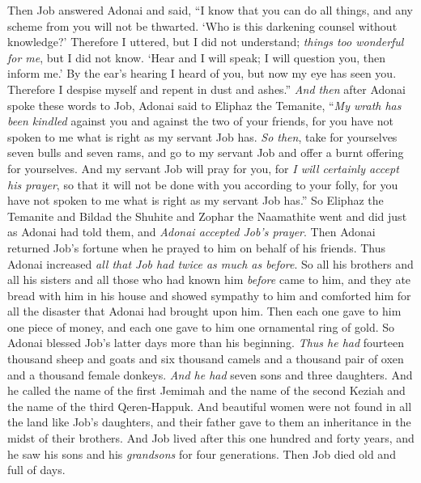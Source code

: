 \begin{biblechapter} %
 Then Job answered Adonai and said,
\verse “I know that you can do all things, 
and any scheme from you will not be thwarted.
\verse ‘Who is this darkening counsel without knowledge?’ 
Therefore I uttered, but I did not understand; 
\textit{things too wonderful for me}, but I did not know.
\verse ‘Hear and I will speak; 
I will question you, then inform me.’
\verse By the ear’s hearing I heard of you, 
but now my eye has seen you.
\verse Therefore I despise myself 
and repent in dust and ashes.”
\verse \textit{And then} after Adonai spoke these words to Job, Adonai said to Eliphaz the Temanite, “\textit{My wrath has been kindled} against you and against the two of your friends, for you have not spoken to me what is right as my servant Job has.
\verse \textit{So then}, take for yourselves seven bulls and seven rams, and go to my servant Job and offer a burnt offering for yourselves. And my servant Job will pray for you, for \textit{I will certainly accept his prayer}, so that it will not be done with you according to your folly, for you have not spoken to me what is right as my servant Job has.”
\verse So Eliphaz the Temanite and Bildad the Shuhite and Zophar the Naamathite went and did just as Adonai had told them, and \textit{Adonai accepted Job’s prayer}.
\verse Then Adonai returned Job’s fortune when he prayed to him on behalf of his friends. Thus Adonai increased \textit{all that Job had twice as much as before}.
\verse So all his brothers and all his sisters and all those who had known him \textit{before} came to him, and they ate bread with him in his house and showed sympathy to him and comforted him for all the disaster that Adonai had brought upon him. Then each one gave to him one piece of money, and each one gave to him one ornamental ring of gold.
\verse So Adonai blessed Job’s latter days more than his beginning. \textit{Thus he had} fourteen thousand sheep and goats and six thousand camels and a thousand pair of oxen and a thousand female donkeys.
\verse \textit{And he had} seven sons and three daughters.
\verse And he called the name of the first Jemimah and the name of the second Keziah and the name of the third Qeren-Happuk.
\verse And beautiful women were not found in all the land like Job’s daughters, and their father gave to them an inheritance in the midst of their brothers.
\verse And Job lived after this one hundred and forty years, and he saw his sons and his \textit{grandsons} for four generations.
\verse Then Job died old and full of days.
\end{biblechapter}

